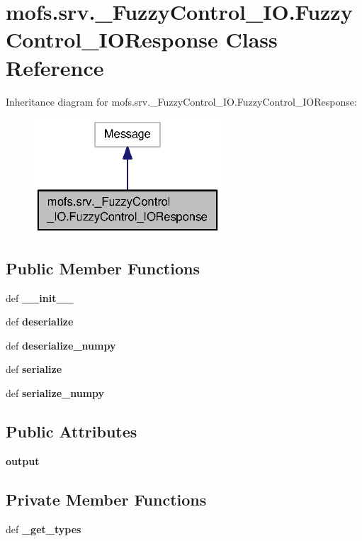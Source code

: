 \section{mofs.\-srv.\-\_\-\-Fuzzy\-Control\-\_\-\-I\-O.\-Fuzzy\-Control\-\_\-\-I\-O\-Response Class Reference}
\label{classmofs_1_1srv_1_1__FuzzyControl__IO_1_1FuzzyControl__IOResponse}


Inheritance diagram for mofs.\-srv.\-\_\-\-Fuzzy\-Control\-\_\-\-I\-O.\-Fuzzy\-Control\-\_\-\-I\-O\-Response\-:\nopagebreak
\begin{figure}[H]
\begin{center}
\leavevmode
\includegraphics[width=198pt]{classmofs_1_1srv_1_1__FuzzyControl__IO_1_1FuzzyControl__IOResponse__inherit__graph}
\end{center}
\end{figure}
\subsection*{Public Member Functions}
\begin{DoxyCompactItemize}
\item 
def {\bf \-\_\-\-\_\-init\-\_\-\-\_\-}
\item 
def {\bf deserialize}
\item 
def {\bf deserialize\-\_\-numpy}
\item 
def {\bf serialize}
\item 
def {\bf serialize\-\_\-numpy}
\end{DoxyCompactItemize}
\subsection*{Public Attributes}
\begin{DoxyCompactItemize}
\item 
{\bf output}
\end{DoxyCompactItemize}
\subsection*{Private Member Functions}
\begin{DoxyCompactItemize}
\item 
def {\bf \-\_\-get\-\_\-types}
\end{DoxyCompactItemize}
